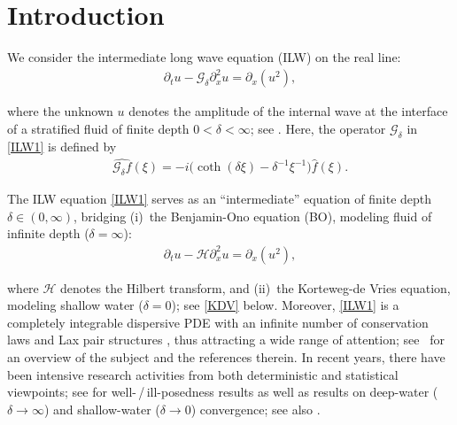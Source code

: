 \documentclass[letterpaper, 11pt,  reqno]{amsart}
\newcommand{\1}{\hspace{0.5mm}\textup{I}\hspace{0.5mm}}
\newcommand{\noi}{\noindent}
\renewcommand{\H}{\mathcal{H}}
\newcommand{\dl}{\delta}
\newcommand{\ft}{\widehat}
\newcommand{\dx}{\partial_x}
\newcommand{\dt}{\partial_t}
\newcommand{\Gdl}{\mathcal{G}_{\dl} }
\numberwithin{equation}{section}
\numberwithin{theorem}{section}
\begin{document}
\section{Introduction}
\label{SEC:1}




We consider  the intermediate long wave equation (ILW)
on the real line:
\begin{align}
\dt u - \mathcal{G}_{\dl}\dx^2 u =\dx(u ^2), 
\label{ILW1}
\end{align}



\noi
where
the unknown $u$ 
denotes the amplitude of the internal wave at the interface
 of a stratified fluid of 
finite depth $0 < \dl < \infty$; 
see \cite{joseph, KKD}.
Here, 
the  operator $\Gdl $ in \eqref{ILW1}
is defined by
\begin{align}
\ft{\Gdl  f}(\xi) = 
-  i\big(\coth(\dl \xi )  - \dl^{-1} \xi^{-1}\big)
\ft f(\xi).
\label{GG1}
\end{align}






The ILW equation \eqref{ILW1}
 serves as an ``intermediate'' equation of finite depth $ \dl \in (0, \infty)$,
bridging 
(i)~the Benjamin-Ono equation (BO), modeling fluid of infinite depth  ($\dl = \infty$):
\begin{align}
\dt u -
 \H \partial_x^2 u  =  \dx (u^2), 
\label{BO}
\end{align}

\noi
where $\H$ denotes the Hilbert transform, 
 and  
(ii)~the Korteweg-de Vries equation, modeling shallow water ($\dl = 0$);
see \eqref{KDV} below.
Moreover,  \eqref{ILW1} is a  completely integrable 
 dispersive PDE
 with an infinite number of conservation laws \cite{Kuper, KSA, KAS82,  
 Matsu, 
 S89}
  and Lax pair structures  \cite{GK, HKV}, thus attracting a wide range of attention;
see~\cite{S19, KS21} for an overview of the subject and the references therein.
In recent years, there have been intensive research activities
 from both deterministic and statistical viewpoints;
see  \cite{ABFS, MST, MV, MPV,  
MPS, Li24, LOZ, IS,
CLOP, CFLOP, FLZ, LP, CLO, GL,HKV, CLOZ} for  well-\,/\,ill-posedness results
as well as  results on 
deep-water  ($\dl \to \infty$)
and shallow-water ($\dl \to 0$)
convergence;
see also 
\cite{CGLLO, GLLO1, GLLO2}.
\end{document}
